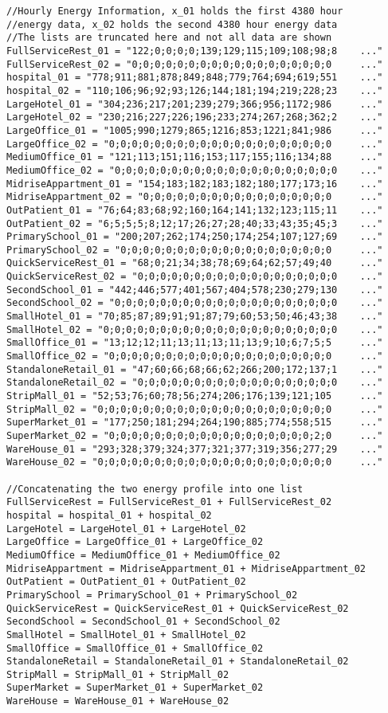 \begin{multicols}{2}
\begin{verbatim}
//Hourly Energy Information, x_01 holds the first 4380 hour 
//energy data, x_02 holds the second 4380 hour energy data
//The lists are truncated here and not all data are shown 
FullServiceRest_01 = "122;0;0;0;0;139;129;115;109;108;98;8    ..."
FullServiceRest_02 = "0;0;0;0;0;0;0;0;0;0;0;0;0;0;0;0;0;0     ..."
hospital_01 = "778;911;881;878;849;848;779;764;694;619;551    ..."
hospital_02 = "110;106;96;92;93;126;144;181;194;219;228;23    ..."
LargeHotel_01 = "304;236;217;201;239;279;366;956;1172;986     ..."
LargeHotel_02 = "230;216;227;226;196;233;274;267;268;362;2    ..."
LargeOffice_01 = "1005;990;1279;865;1216;853;1221;841;986     ..."
LargeOffice_02 = "0;0;0;0;0;0;0;0;0;0;0;0;0;0;0;0;0;0;0;0     ..."
MediumOffice_01 = "121;113;151;116;153;117;155;116;134;88     ..."
MediumOffice_02 = "0;0;0;0;0;0;0;0;0;0;0;0;0;0;0;0;0;0;0;0    ..."
MidriseAppartment_01 = "154;183;182;183;182;180;177;173;16    ..."
MidriseAppartment_02 = "0;0;0;0;0;0;0;0;0;0;0;0;0;0;0;0;0     ..."
OutPatient_01 = "76;64;83;68;92;160;164;141;132;123;115;11    ..."
OutPatient_02 = "6;5;5;5;8;12;17;26;27;28;40;33;43;35;45;3    ..."
PrimarySchool_01 = "200;207;262;174;250;174;254;107;127;69    ..."
PrimarySchool_02 = "0;0;0;0;0;0;0;0;0;0;0;0;0;0;0;0;0;0;0     ..."
QuickServiceRest_01 = "68;0;21;34;38;78;69;64;62;57;49;40     ..."
QuickServiceRest_02 = "0;0;0;0;0;0;0;0;0;0;0;0;0;0;0;0;0;0    ..."
SecondSchool_01 = "442;446;577;401;567;404;578;230;279;130    ..."
SecondSchool_02 = "0;0;0;0;0;0;0;0;0;0;0;0;0;0;0;0;0;0;0;0    ..."
SmallHotel_01 = "70;85;87;89;91;91;87;79;60;53;50;46;43;38    ..."
SmallHotel_02 = "0;0;0;0;0;0;0;0;0;0;0;0;0;0;0;0;0;0;0;0;0    ..."
SmallOffice_01 = "13;12;12;11;13;11;13;11;13;9;10;6;7;5;5     ..."
SmallOffice_02 = "0;0;0;0;0;0;0;0;0;0;0;0;0;0;0;0;0;0;0;0     ..."
StandaloneRetail_01 = "47;60;66;68;66;62;266;200;172;137;1    ..."
StandaloneRetail_02 = "0;0;0;0;0;0;0;0;0;0;0;0;0;0;0;0;0;0    ..."
StripMall_01 = "52;53;76;60;78;56;274;206;176;139;121;105     ..."
StripMall_02 = "0;0;0;0;0;0;0;0;0;0;0;0;0;0;0;0;0;0;0;0;0     ..."
SuperMarket_01 = "177;250;181;294;264;190;885;774;558;515     ..."
SuperMarket_02 = "0;0;0;0;0;0;0;0;0;0;0;0;0;0;0;0;0;0;2;0     ..."
WareHouse_01 = "293;328;379;324;377;321;377;319;356;277;29    ..."
WareHouse_02 = "0;0;0;0;0;0;0;0;0;0;0;0;0;0;0;0;0;0;0;0;0     ..."
        
//Concatenating the two energy profile into one list
FullServiceRest = FullServiceRest_01 + FullServiceRest_02
hospital = hospital_01 + hospital_02 
LargeHotel = LargeHotel_01 + LargeHotel_02 
LargeOffice = LargeOffice_01 + LargeOffice_02 
MediumOffice = MediumOffice_01 + MediumOffice_02 
MidriseAppartment = MidriseAppartment_01 + MidriseAppartment_02
OutPatient = OutPatient_01 + OutPatient_02 
PrimarySchool = PrimarySchool_01 + PrimarySchool_02
QuickServiceRest = QuickServiceRest_01 + QuickServiceRest_02 
SecondSchool = SecondSchool_01 + SecondSchool_02
SmallHotel = SmallHotel_01 + SmallHotel_02
SmallOffice = SmallOffice_01 + SmallOffice_02
StandaloneRetail = StandaloneRetail_01 + StandaloneRetail_02
StripMall = StripMall_01 + StripMall_02 
SuperMarket = SuperMarket_01 + SuperMarket_02 
WareHouse = WareHouse_01 + WareHouse_02


\end{verbatim}
\end{multicols}
